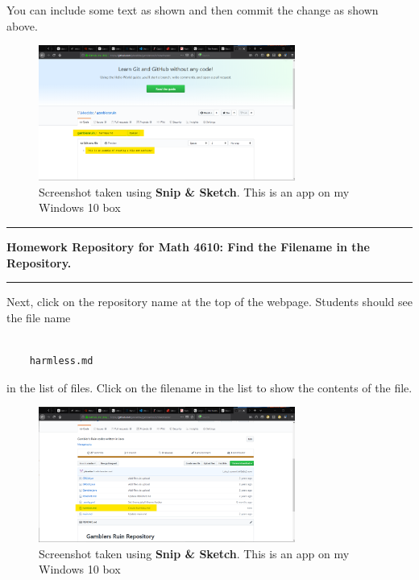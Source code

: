 \documentclass[10pt,fleqn]{article}
\begin{document}
You can include some text as shown and then commit the change as shown above.
\vfill
\begin{figure}[h]
\centering
\includegraphics[width=0.75\textwidth]{../images/github_08.png}
\caption{{Screenshot} taken using {\bf Snip \& Sketch}. This is an app on
         my Windows 10 box}
\end{figure}
\eject
\vskip0.1in\hrule\vskip0.1in
\noindent
{\bf Homework Repository for Math 4610: Find the Filename in the Repository.} 
\vskip0.1in\hrule\vskip0.1in
Next, click on the repository name at the top of the webpage. Students should
see the file name
\begin{verbatim}

    harmless.md

\end{verbatim}
in the list of files. Click on the filename in the list to show the contents of
the file. 
\vfill
\begin{figure}[h]
\centering
\includegraphics[width=0.75\textwidth]{../images/github_09.png}
\caption{{Screenshot} taken using {\bf Snip \& Sketch}. This is an app on
         my Windows 10 box}
\end{figure}
\eject
\end{document}
